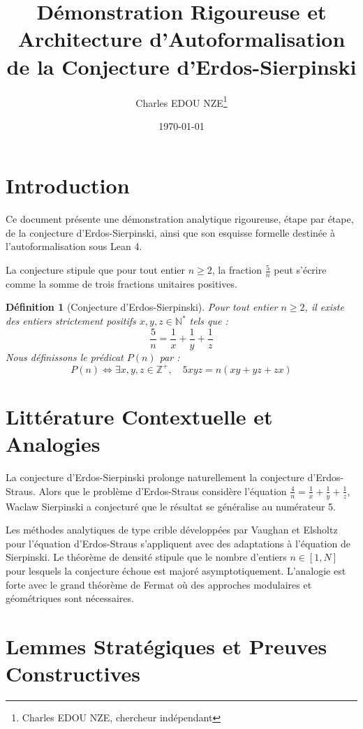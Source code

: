 \documentclass[12pt,a4paper]{article}
\title{Démonstration Rigoureuse et Architecture d'Autoformalisation de la Conjecture d'Erdos-Sierpinski}
\author{Charles EDOU NZE\thanks{Charles EDOU NZE, chercheur indépendant}}
\date{\today}
\newtheorem{definition}{Définition}
\begin{document}
\maketitle
\tableofcontents
\newpage

\section{Introduction}
Ce document présente une démonstration analytique rigoureuse, étape par étape, de la conjecture d'Erdos-Sierpinski, ainsi que son esquisse formelle destinée à l'autoformalisation sous Lean 4.

La conjecture stipule que pour tout entier $n \geq 2$, la fraction $\frac{5}{n}$ peut s'écrire comme la somme de trois fractions unitaires positives.

\begin{definition}[Conjecture d'Erdos-Sierpinski]
Pour tout entier $n \ge 2$, il existe des entiers strictement positifs $x, y, z \in \mathbb{N}^{*}$ tels que :
\begin{equation}
\frac{5}{n} = \frac{1}{x} + \frac{1}{y} + \frac{1}{z}
\label{eq:sierpinski}
\end{equation}
Nous définissons le prédicat $P(n)$ par :
$$ P(n) \iff \exists x, y, z \in \mathbb{Z}^{+}, \quad 5xyz = n(xy + yz + zx) $$
\end{definition}

\section{Littérature Contextuelle et Analogies}

La conjecture d'Erdos-Sierpinski prolonge naturellement la conjecture d'Erdos-Straus. Alors que le problème d'Erdos-Straus considère l'équation $\frac{4}{n} = \frac{1}{x} + \frac{1}{y} + \frac{1}{z}$, Waclaw Sierpinski a conjecturé que le résultat se généralise au numérateur 5.

Les méthodes analytiques de type crible développées par Vaughan et Elsholtz pour l'équation d'Erdos-Straus s'appliquent avec des adaptations à l'équation de Sierpinski. Le théorème de densité stipule que le nombre d'entiers $n \in [1, N]$ pour lesquels la conjecture échoue est majoré asymptotiquement. L'analogie est forte avec le grand théorème de Fermat où des approches modulaires et géométriques sont nécessaires.

\section{Lemmes Stratégiques et Preuves Constructives}
\end{document}
